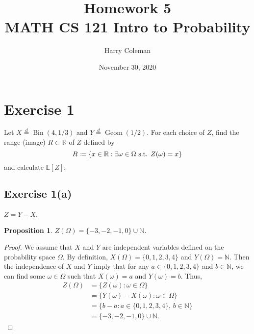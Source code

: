 \documentclass[12pt]{article}
\newtheorem{proposition}{Proposition}
\newenvironment{problem}
    {\begin{lrbox}{\mybox}\begin{minipage}{0.98\textwidth}}
    {\end{minipage}\end{lrbox}\framebox[\textwidth]{\usebox{\mybox}}}
\newcommand*{\defeq}{\mathrel{\vcenter{\baselineskip0.5ex \lineskiplimit0pt\hbox{\scriptsize.}\hbox{\scriptsize.}}}=}
\newcommand{\N}{\mathbb{N}} %
\newcommand{\R}{\mathbb{R}} %
\newcommand{\E}{\mathbb{E}} %
\newcommand{\<}{\left\langle} %
\renewcommand{\>}{\right\rangle} %
\begin{document}
 
\title{Homework 5\\
    \large MATH CS 121 Intro to Probability
}
\author{Harry Coleman}
\date{November 30, 2020}
\maketitle

\section*{Exercise 1}
\begin{problem}
    Let $X \overset{d}{=} \operatorname{Bin}(4, 1/3)$ and $Y \overset{d}{=} \operatorname{Geom}(1/2)$. For each choice of $Z$, find the range (image) $R \subset \R$ of $Z$ defined by
    \[R \defeq \{x \in \R : \exists \omega \in \Omega \text{ s.t. } Z(\omega) = x\}\]
    and calculate $\E[Z]$:
\end{problem}

\subsection*{Exercise 1(a)}
\begin{problem}
    $Z = Y - X$.
\end{problem}

\begin{proposition}
    $Z(\Omega) = \{-3, -2, -1, 0\} \cup \N$.
\end{proposition}

\begin{proof}
    We assume that $X$ and $Y$ are independent variables defined on the probability space $\Omega$. By definition, $X(\Omega) = \{0, 1, 2, 3, 4\}$ and $Y(\Omega) = \N$. Then the independence of $X$ and $Y$ imply that for any $a \in \{0, 1, 2, 3, 4\}$ and $b \in \N$, we can find some $\omega \in \Omega$ such that $X(\omega) = a$ and $Y(\omega) = b$. Thus,
    \begin{align*}
        Z(\Omega) 
            &= \{Z(\omega) : \omega \in \Omega\} \\[1em]
            &= \{Y(\omega) - X(\omega) : \omega \in \Omega\} \\[1em]
            &= \{b - a : a \in \{0, 1, 2, 3, 4\},\, b \in \N\} \\[1em]
            &= \{-3, -2, -1, 0\} \cup \N.
    \end{align*}
    
\end{proof}
\end{document}
